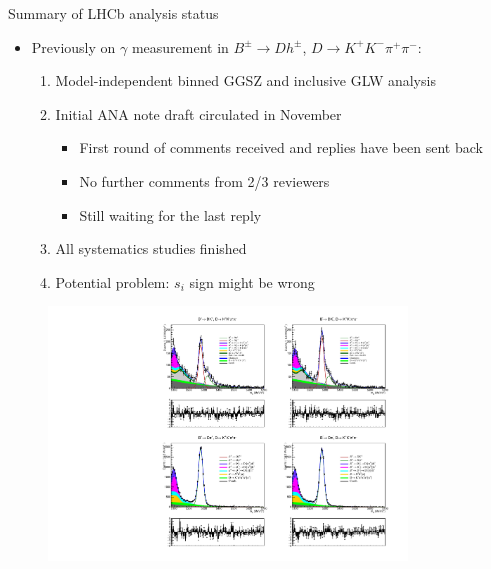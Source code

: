 \documentclass{beamer}
\begin{document}
\begin{frame}{Summary of LHCb analysis status}
  \begin{itemize}
    \setlength\itemsep{0.5em}
    \item{Previously on $\gamma$ measurement in $B^\pm\to Dh^\pm$, $D\to K^+K^-\pi^+\pi^-$:}
    \begin{enumerate}
      \setlength\itemsep{0.5em}
      \item{Model-independent binned GGSZ and inclusive GLW analysis}
      \item{Initial ANA note draft circulated in November}
      \begin{itemize}
        \item{First round of comments received and replies have been sent back}
        \item{No further comments from 2/3 reviewers}
        \item{Still waiting for the last reply}
      \end{itemize}
      \item{All systematics studies finished}
      \item{Potential problem: $s_i$ sign might be wrong}
    \end{enumerate}
  \end{itemize}
  \begin{figure}
    \includegraphics[width = 0.85\textwidth, trim = {0 12.8cm 0 0}, clip]{Plots/d2kkpipi_fiveL_allDP_GLW.pdf}
  \end{figure}
\end{frame}
\end{document}
